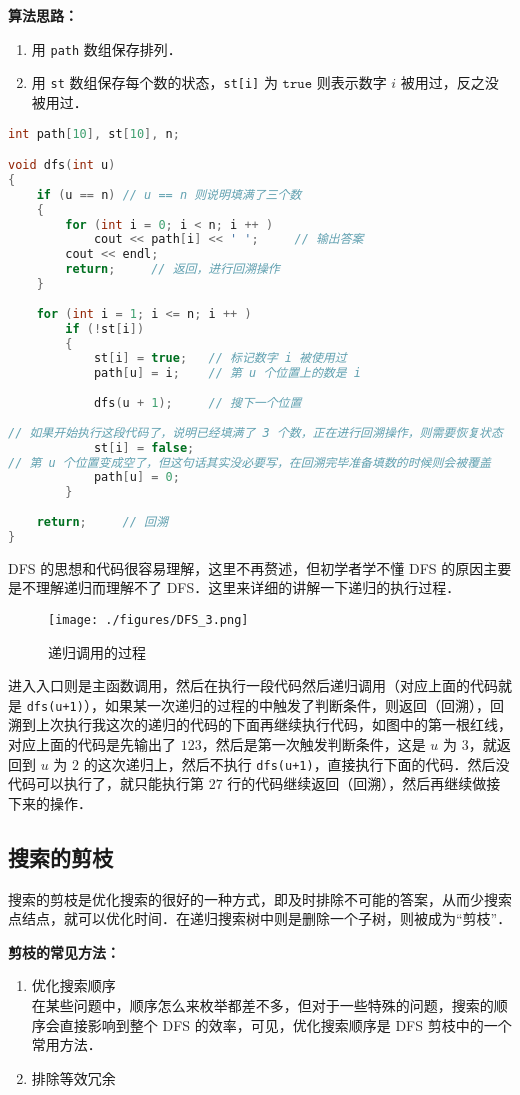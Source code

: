 \textbf{算法思路：}
\begin{enumerate}
\item 用 \verb|path| 数组保存排列．

\item 用 \verb|st| 数组保存每个数的状态，\verb|st[i]| 为 $\mathtt{true}$ 则表示数字 $i$ 被用过，反之没被用过．

\end{enumerate}
\begin{lstlisting}[language=cpp]
int path[10], st[10], n;

void dfs(int u)
{
    if (u == n) // u == n 则说明填满了三个数
    {
        for (int i = 0; i < n; i ++ )
            cout << path[i] << ' ';     // 输出答案
        cout << endl;
        return;     // 返回，进行回溯操作
    }
    
    for (int i = 1; i <= n; i ++ )
        if (!st[i])
        {
            st[i] = true;   // 标记数字 i 被使用过
            path[u] = i;    // 第 u 个位置上的数是 i
            
            dfs(u + 1);     // 搜下一个位置
            
// 如果开始执行这段代码了，说明已经填满了 3 个数，正在进行回溯操作，则需要恢复状态
            st[i] = false;  
// 第 u 个位置变成空了，但这句话其实没必要写，在回溯完毕准备填数的时候则会被覆盖
            path[u] = 0;    
        }
        
    return;     // 回溯
}
\end{lstlisting}

DFS 的思想和代码很容易理解，这里不再赘述，但初学者学不懂 DFS 的原因主要是不理解递归而理解不了 DFS．这里来详细的讲解一下递归的执行过程．

\begin{figure}[ht]
\centering
\texttt{[image: ./figures/DFS\_3.png]}
\caption{递归调用的过程} \label{DFS_fig3}
\end{figure}


进入入口则是主函数调用，然后在执行一段代码然后递归调用（对应上面的代码就是 \verb|dfs(u+1)|），如果某一次递归的过程的中触发了判断条件，则返回（回溯），回溯到上次执行我这次的递归的代码的下面再继续执行代码，如图中的第一根红线，对应上面的代码是先输出了 $1 2 3$，然后是第一次触发判断条件，这是 $u$ 为 $3$，就返回到 $u$ 为 $2$ 的这次递归上，然后不执行 \verb|dfs(u+1)|，直接执行下面的代码．然后没代码可以执行了，就只能执行第 $27$ 行的代码继续返回（回溯），然后再继续做接下来的操作．


\subsection{搜索的剪枝}

搜索的剪枝是优化搜索的很好的一种方式，即及时排除不可能的答案，从而少搜索点结点，就可以优化时间．在递归搜索树中则是删除一个子树，则被成为“剪枝”．

\textbf{剪枝的常见方法：}

\begin{enumerate}
\item 优化搜索顺序\\
在某些问题中，顺序怎么来枚举都差不多，但对于一些特殊的问题，搜索的顺序会直接影响到整个 DFS 的效率，可见，优化搜索顺序是 DFS 剪枝中的一个常用方法．

\item 排除等效冗余 
\end{enumerate}